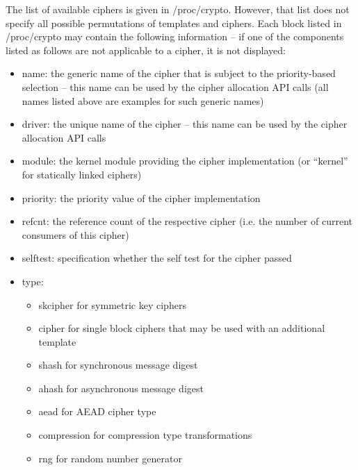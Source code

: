 \documentclass[a4paper,8pt,english]{sphinxmanual}
\begin{document}
The list of available ciphers is given in /proc/crypto. However, that
list does not specify all possible permutations of templates and
ciphers. Each block listed in /proc/crypto may contain the following
information -- if one of the components listed as follows are not
applicable to a cipher, it is not displayed:
\begin{itemize}
\item {} 
name: the generic name of the cipher that is subject to the
priority-based selection -- this name can be used by the cipher
allocation API calls (all names listed above are examples for such
generic names)

\item {} 
driver: the unique name of the cipher -- this name can be used by the
cipher allocation API calls

\item {} 
module: the kernel module providing the cipher implementation (or
``kernel'' for statically linked ciphers)

\item {} 
priority: the priority value of the cipher implementation

\item {} 
refcnt: the reference count of the respective cipher (i.e. the number
of current consumers of this cipher)

\item {} 
selftest: specification whether the self test for the cipher passed

\item {} 
type:
\begin{itemize}
\item {} 
skcipher for symmetric key ciphers

\item {} 
cipher for single block ciphers that may be used with an
additional template

\item {} 
shash for synchronous message digest

\item {} 
ahash for asynchronous message digest

\item {} 
aead for AEAD cipher type

\item {} 
compression for compression type transformations

\item {} 
rng for random number generator


\end{itemize}
\end{itemize}
\end{document}

